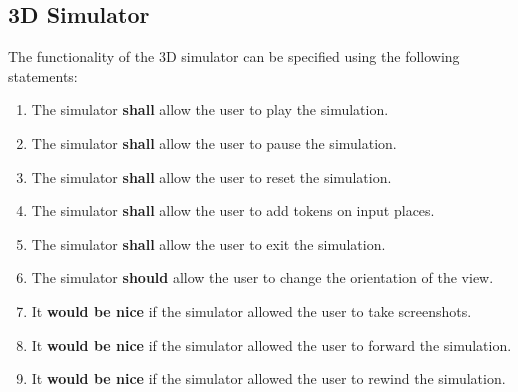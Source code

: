 \subsection{3D Simulator}
\label{sec:sf-simulator}
The functionality of the 3D simulator can be specified using the following statements:
\begin{enumerate}
\item The simulator \textbf{shall} allow the user to play the simulation.
\item The simulator \textbf{shall} allow the user to pause the simulation.
\item The simulator \textbf{shall} allow the user to reset the simulation.
\item The simulator \textbf{shall} allow the user to add tokens on input places.
\item The simulator \textbf{shall} allow the user to exit the simulation.
\item The simulator \textbf{should} allow the user to change the orientation of the view.
\item It \textbf{would be nice} if the simulator allowed the user to take screenshots.
\item It \textbf{would be nice} if the simulator allowed the user to forward the simulation.
\item It \textbf{would be nice} if the simulator allowed the user to rewind the simulation.
\end{enumerate}